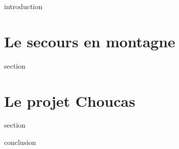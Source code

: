 \chaptertoc{}

\label{sec:1-int}
{introduction}

\section{Le secours en montagne}
\label{sec:1-1}
{section}

\section{Le projet Choucas}
\label{sec:1-2}
{section}

\label{sec:1-cnc}
{conclusion}

